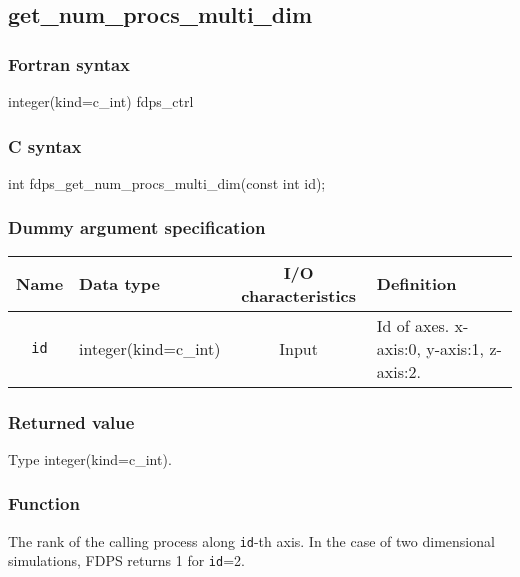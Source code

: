 \subsection{get\_num\_procs\_multi\_dim}
\subsubsection*{Fortran syntax}
\begin{screen}
\begin{spverbatim}
integer(kind=c_int) fdps_ctrl%
\end{spverbatim}
\end{screen}

\subsubsection*{C syntax}
\begin{screen}
\begin{spverbatim}
int fdps_get_num_procs_multi_dim(const int id);
\end{spverbatim}
\end{screen}

\subsubsection*{Dummy argument specification}
\begin{table}[h]
\begin{tabularx}{\linewidth}{cXcX}
\toprule
\rowcolor{Snow2}
Name & Data type & I/O characteristics & Definition \\
\midrule
\verb|id| & integer(kind=c\_int) & Input & Id of axes. x-axis:0, y-axis:1, z-axis:2.\\
\bottomrule
\end{tabularx}
\end{table}

\subsubsection*{Returned value}
Type integer(kind=c\_int).

\subsubsection*{Function}
The rank of the calling process along {\tt id}-th axis. In the case of two dimensional simulations, FDPS returns 1 for {\tt id}=2.
\clearpage

